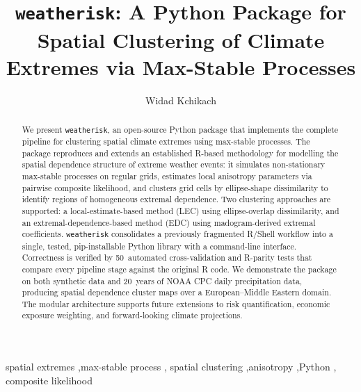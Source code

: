 \documentclass[a4paper]{elsarticle}
\begin{document}
\begin{frontmatter}

\title{\texttt{weatherisk}: A Python Package for Spatial Clustering of Climate Extremes via Max-Stable Processes}

\author[awi]{Widad Kchikach}


\begin{abstract}
We present \texttt{weatherisk}, an open-source Python package that implements
the complete pipeline for clustering spatial climate extremes using
max-stable processes.
The package reproduces and extends an established R-based methodology
for modelling the spatial dependence structure of extreme weather events:
it simulates non-stationary max-stable processes on regular grids,
estimates local anisotropy parameters via pairwise composite likelihood,
and clusters grid cells by ellipse-shape dissimilarity to identify regions
of homogeneous extremal dependence.
Two clustering approaches are supported: a local-estimate-based method
(LEC) using ellipse-overlap dissimilarity, and an extremal-dependence-based
method (EDC) using madogram-derived extremal coefficients.
\texttt{weatherisk} consolidates a previously fragmented R/Shell workflow
into a single, tested, pip-installable Python library with a command-line
interface.
Correctness is verified by 50~automated cross-validation and R-parity
tests that compare every pipeline stage against the original R code.
We demonstrate the package on both synthetic data and 20~years of NOAA
CPC daily precipitation data, producing spatial dependence cluster maps
over a European--Middle Eastern domain.
The modular architecture supports future extensions to risk quantification,
economic exposure weighting, and forward-looking climate projections.
\end{abstract}

\begin{keyword}
spatial extremes \sep max-stable process \sep
spatial clustering \sep anisotropy \sep Python \sep
composite likelihood
\end{keyword}

\end{frontmatter}
\end{document}
